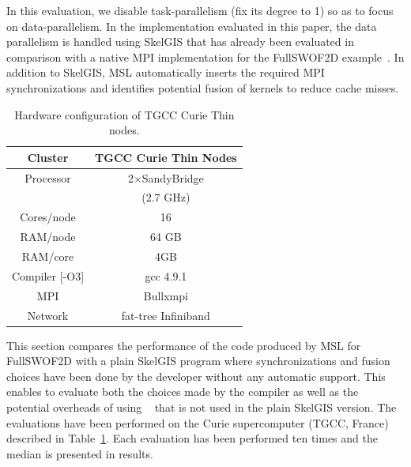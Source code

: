 In this evaluation, we disable task-parallelism (fix its degree to 1) so as to focus on data-parallelism.
In the implementation evaluated in this paper, the data parallelism is handled using SkelGIS that has already been evaluated in comparison with a native MPI implementation for the FullSWOF2D example~\cite{CPE:CPE3494}.
In addition to SkelGIS, MSL automatically inserts the required MPI synchronizations and identifies potential fusion of kernels to reduce cache misses.

\begin{table}[!ht]
\begin{center}
 \begin{tabular}{|c|c|}
   \hline
    Cluster & \textbf{TGCC Curie Thin Nodes}\\
     \hline         
    Processor & 2$\times$SandyBridge\\
    & (2.7 GHz)\\
    Cores/node & 16 \\
    RAM/node & 64 GB\\
    RAM/core & 4GB\\
    Compiler [-O3] & gcc 4.9.1\\
    MPI & Bullxmpi\\
    Network & fat-tree Infiniband\\
    \hline
 \end{tabular}
 \caption{\label{tab:TGCC}Hardware configuration of TGCC Curie Thin nodes.}
 \end{center}
\end{table}

This section compares the performance of the code produced by MSL for FullSWOF2D with a plain SkelGIS program where synchronizations and fusion choices have been done by the developer without any automatic support.
This enables to evaluate both the choices made by the compiler as well as the potential overheads of using \llc~\cite{l2c} that is not used in the plain SkelGIS version.
The evaluations have been performed on the Curie supercomputer (TGCC, France) described in Table~\ref{tab:TGCC}.
Each evaluation has been performed ten times and the median is presented in results.


